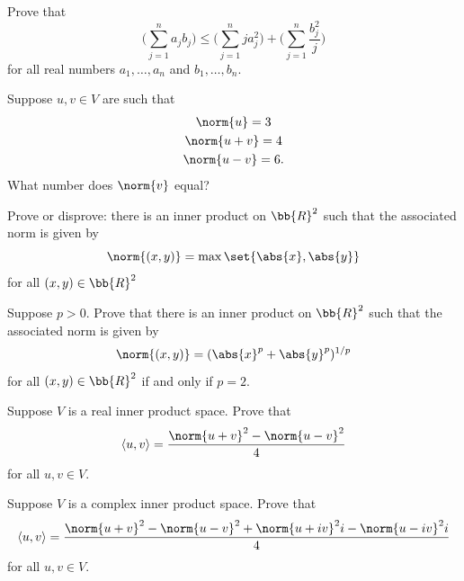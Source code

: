 \documentclass[12pt,letterpaper]{hmcpset}
\begin{document}
\pagebreak

\begin{problem}[15]
	Prove that
	\[
		\Big(\sum_{j = 1}^n a_j b_j \Big) \le \Big(\sum_{j = 1}^n j a_j^2 \Big) + \Big(\sum_{j = 1}^n \frac{b_j^2}{j} \Big) 
	\]
	for all real numbers $a_1, \ldots, a_n$ and $b_1, \ldots, b_n$.
\end{problem}

\pagebreak

\begin{problem}[16]
	Suppose $u, v \in V$ are such that
	\[
		\begin{gathered}
			\norm{u} = 3 \\
			\norm{u + v} = 4 \\
			\norm{u - v} = 6.
		\end{gathered}
	\]
	What number does $\norm{v}$ equal?
\end{problem}

\pagebreak

\begin{problem}[17]
	Prove or disprove: there is an inner product on $\bb{R}^2$ such that the associated norm is given by
	\[
		\norm{(x, y)} = \max \set{\abs{x}, \abs{y}}
	\]
	for all $(x, y) \in  \bb{R}^2$
\end{problem}

\pagebreak

\begin{problem}[18]
	Suppose $p > 0$. Prove that there is an inner product on $\bb{R}^2$ such that the associated norm is given by
	\[
		\norm{(x, y)} = (\abs{x}^p + \abs{y}^p)^{1/p}
	\]
	for all $(x, y) \in \bb{R}^2$ if and only if $p = 2$.
\end{problem}

\pagebreak

\begin{problem}[19]
	Suppose $V$ is a real inner product space. Prove that
	\[
		\langle u, v \rangle = \frac{\norm{u + v}^2 - \norm{u - v}^2}{4}	
	\]
	for all $u, v \in V$.
\end{problem}

\pagebreak

\begin{problem}[20]
	Suppose $V$ is a complex inner product space. Prove that
	\[
		\langle u, v \rangle = \frac{\norm{u + v}^2 - \norm{u - v}^2 + \norm{u + i v}^2 i - \norm{u - i v}^2 i}{4}	
	\]
	for all $u, v \in V$.
\end{problem}

\pagebreak
\end{document}
